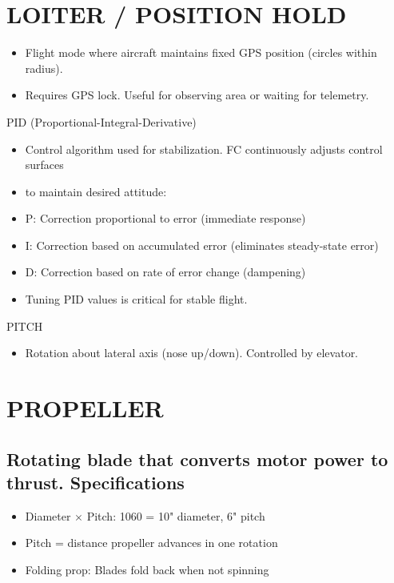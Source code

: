 \documentclass[11pt,letterpaper]{article}
\begin{document}
\section{LOITER / POSITION HOLD}

\begin{itemize}
  \item Flight mode where aircraft maintains fixed GPS position (circles within radius).
  \item Requires GPS lock. Useful for observing area or waiting for telemetry.
\end{itemize}

PID (Proportional-Integral-Derivative)\par

\begin{itemize}
  \item Control algorithm used for stabilization. FC continuously adjusts control surfaces
  \item to maintain desired attitude:
  \item P: Correction proportional to error (immediate response)
  \item I: Correction based on accumulated error (eliminates steady-state error)
  \item D: Correction based on rate of error change (dampening)
  \item Tuning PID values is critical for stable flight.
\end{itemize}

PITCH\par

\begin{itemize}
  \item Rotation about lateral axis (nose up/down). Controlled by elevator.
\end{itemize}

\section{PROPELLER}

\subsection{Rotating blade that converts motor power to thrust. Specifications}

\begin{itemize}
  \item Diameter $\times$ Pitch: 1060 = 10" diameter, 6" pitch
  \item Pitch = distance propeller advances in one rotation
  \item Folding prop: Blades fold back when not spinning
\end{itemize}
\end{document}

